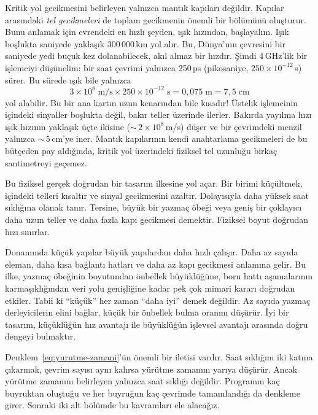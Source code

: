 Kritik yol gecikmesini belirleyen yalnızca mantık kapıları değildir. Kapılar arasındaki \emph{tel gecikmeleri} de toplam gecikmenin önemli bir bölümünü oluşturur. Bunu anlamak için evrendeki en hızlı şeyden, ışık hızından, başlayalım. Işık boşlukta saniyede yaklaşık 300\,000\,km yol alır. Bu, Dünya'nın çevresini bir saniyede yedi buçuk kez dolanabilecek, akıl almaz bir hızdır. Şimdi 4\,GHz'lik bir işlemciyi düşünelim: bir saat çevrimi yalnızca 250\,ps (pikosaniye, $250 \times 10^{-12}$\,s) sürer. Bu sürede ışık bile yalnızca
%
\[
3 \times 10^{8}\;\text{m/s} \times 250 \times 10^{-12}\;\text{s} = 0{,}075\;\text{m} = 7{,}5\;\text{cm}
\]
%
yol alabilir. Bu bir ana kartın uzun kenarından bile kısadır! Üstelik işlemcinin içindeki sinyaller boşlukta değil, bakır teller üzerinde ilerler. Bakırda yayılma hızı ışık hızının yaklaşık üçte ikisine (${\sim}\,2 \times 10^{8}$\,m/s) düşer ve bir çevrimdeki menzil yalnızca ${\sim}\,5$\,cm'ye iner. Mantık kapılarının kendi anahtarlama gecikmeleri de bu bütçeden pay aldığında, kritik yol üzerindeki fiziksel tel uzunluğu birkaç santimetreyi geçemez.

Bu fiziksel gerçek doğrudan bir tasarım ilkesine yol açar. Bir birimi küçültmek, içindeki telleri kısaltır ve sinyal gecikmesini azaltır. Dolayısıyla daha yüksek saat sıklığına olanak tanır. Tersine, büyük bir yazmaç öbeği veya geniş bir çoklayıcı daha uzun teller ve daha fazla kapı gecikmesi demektir. Fiziksel boyut doğrudan hızı sınırlar.

\begin{tanim}
Donanımda küçük yapılar büyük yapılardan daha hızlı çalışır. Daha az sayıda eleman, daha kısa bağlantı hatları ve daha az kapı gecikmesi anlamına gelir. Bu ilke, yazmaç öbeğinin boyutundan önbellek büyüklüğüne, boru hattı aşamalarının karmaşıklığından veri yolu genişliğine kadar pek çok mimari kararı doğrudan etkiler. Tabii ki ``küçük'' her zaman ``daha iyi'' demek değildir. Az sayıda yazmaç derleyicilerin elini bağlar, küçük bir önbellek bulma oranını düşürür. İyi bir tasarım, küçüklüğün hız avantajı ile büyüklüğün işlevsel avantajı arasında doğru dengeyi bulmaktır.
\end{tanim}

Denklem~\ref{eq:yurutme-zamani}'ün önemli bir iletisi vardır. Saat sıklığını iki katına çıkarmak, çevrim sayısı aynı kalırsa yürütme zamanını yarıya düşürür. Ancak yürütme zamanını belirleyen yalnızca saat sıklığı değildir. Programın kaç buyruktan oluştuğu ve her buyruğun kaç çevrimde tamamlandığı da denkleme girer. Sonraki iki alt bölümde bu kavramları ele alacağız.


